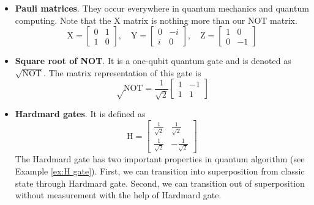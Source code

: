 \documentclass{easyclass}
\begin{document}
\begin{itemize}
	\item \textbf{Pauli matrices}. They occur everywhere in quantum mechanics and quantum computing. Note that the X matrix is nothing more than our NOT matrix.
	\begin{equation}
		\mathrm{X}=\begin{bmatrix}
			0 & 1\\
			1 & 0
		\end{bmatrix},\quad
		\mathrm{Y}=\begin{bmatrix}
			0 & -i\\
			i & 0
		\end{bmatrix},\quad
		\mathrm{Z}=\begin{bmatrix}
			1 & 0\\
			0 & -1
		\end{bmatrix}
	\end{equation}

	\item \textbf{Square root of NOT}. It is a one-qubit quantum gate and is denoted as $\sqrt{\mathrm{NOT}}$. The matrix representation of this gate is
	\begin{equation}
		\sqrt\mathrm{NOT}=\frac{1}{\sqrt{2}}\begin{bmatrix}
			1 & -1\\
			1 & 1
		\end{bmatrix}
	\end{equation}

	\item \textbf{Hardmard gates}. It is defined as 
	\begin{equation}
		\mathrm{H}=\begin{bmatrix}
			\frac{1}{\sqrt{2}} & \frac{1}{\sqrt{2}}\\
			\frac{1}{\sqrt{2}} & -\frac{1}{\sqrt{2}}
		\end{bmatrix}
	\end{equation}
	The Hardmard gate has two important properties in quantum algorithm (see Example \ref{ex:H gate}). First, we can transition into superposition from classic state through Hardmard gate. Second, we can transition out of superposition without measurement with the help of Hardmard gate. 


\end{itemize}
\end{document}
